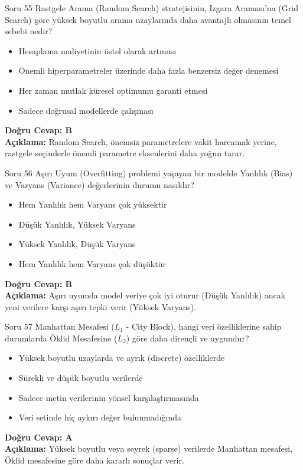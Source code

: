 \documentclass[12pt,a4paper]{article}
\begin{document}
\begin{testcard}{Soru 55}
    Rastgele Arama (Random Search) stratejisinin, Izgara Araması'na (Grid Search) göre yüksek boyutlu arama uzaylarında daha avantajlı olmasının temel sebebi nedir?
    \begin{itemize}
        \item[A)] Hesaplama maliyetinin üstel olarak artması
        \item[B)] Önemli hiperparametreler üzerinde daha fazla benzersiz değer denemesi
        \item[C)] Her zaman mutlak küresel optimumu garanti etmesi
        \item[D)] Sadece doğrusal modellerde çalışması
    \end{itemize}
    \tcblower
    \textbf{Doğru Cevap: B} \\
    \textbf{Açıklama:} Random Search, önemsiz parametrelere vakit harcamak yerine, rastgele seçimlerle önemli parametre eksenlerini daha yoğun tarar.
\end{testcard}

\begin{testcard}{Soru 56}
    Aşırı Uyum (Overfitting) problemi yaşayan bir modelde Yanlılık (Bias) ve Varyans (Variance) değerlerinin durumu nasıldır?
    \begin{itemize}
        \item[A)] Hem Yanlılık hem Varyans çok yüksektir
        \item[B)] Düşük Yanlılık, Yüksek Varyans
        \item[C)] Yüksek Yanlılık, Düşük Varyans
        \item[D)] Hem Yanlılık hem Varyans çok düşüktür
    \end{itemize}
    \tcblower
    \textbf{Doğru Cevap: B} \\
    \textbf{Açıklama:} Aşırı uyumda model veriye çok iyi oturur (Düşük Yanlılık) ancak yeni verilere karşı aşırı tepki verir (Yüksek Varyans).
\end{testcard}

\begin{testcard}{Soru 57}
    Manhattan Mesafesi ($L_1$ - City Block), hangi veri özelliklerine sahip durumlarda Öklid Mesafesine ($L_2$) göre daha dirençli ve uygundur?
    \begin{itemize}
        \item[A)] Yüksek boyutlu uzaylarda ve ayrık (discrete) özelliklerde
        \item[B)] Sürekli ve düşük boyutlu verilerde
        \item[C)] Sadece metin verilerinin yönsel karşılaştırmasında
        \item[D)] Veri setinde hiç aykırı değer bulunmadığında
    \end{itemize}
    \tcblower
    \textbf{Doğru Cevap: A} \\
    \textbf{Açıklama:} Yüksek boyutlu veya seyrek (sparse) verilerde Manhattan mesafesi, Öklid mesafesine göre daha kararlı sonuçlar verir.
\end{testcard}
\end{document}
